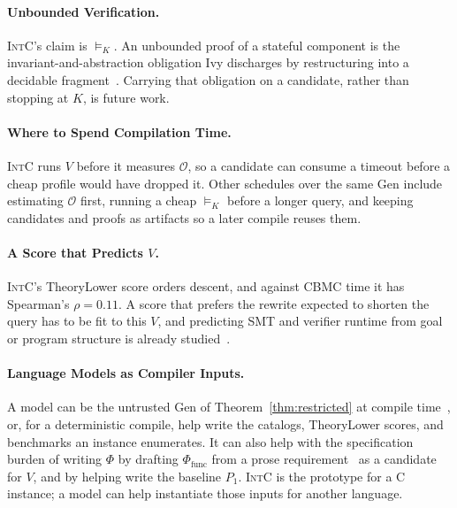 \paragraph{Unbounded Verification.}
\textsc{IntC}'s claim is \(\models_K\). An unbounded proof of a stateful
component is the invariant-and-abstraction obligation Ivy discharges by
restructuring into a decidable
fragment~\cite{padon2016ivy,padon2017paxosepr}. Carrying that obligation
on a candidate, rather than stopping at \(K\), is future work.

\paragraph{Where to Spend Compilation Time.}
\textsc{IntC} runs \(V\) before it measures \(\mathcal{O}\), so a
candidate can consume a timeout before a cheap profile would have
dropped it. Other schedules over the same \(\mathrm{Gen}\) include
estimating \(\mathcal{O}\) first, running a cheap \(\models_K\) before a
longer query, and keeping candidates and proofs as artifacts so a later
compile reuses them.

\paragraph{A Score that Predicts \(V\).}
\textsc{IntC}'s TheoryLower score orders descent, and against CBMC time it
has Spearman's \(\rho = 0.11\). A score that prefers the rewrite expected
to shorten the query has to be fit to this \(V\), and predicting SMT and
verifier runtime from goal or program structure is already
studied~\cite{healy2017where4,leeson2022graves}.

\paragraph{Language Models as Compiler Inputs.}
\label{sec:discussion_lm}
A model can be the untrusted \(\mathrm{Gen}\) of
Theorem~\ref{thm:restricted} at compile
time~\cite{taneja2025llmvectorizer,fang2026llmveriopt,jiang2026segabench},
or, for a deterministic compile, help write the catalogs, TheoryLower
scores, and benchmarks an instance enumerates. It can also help with the
specification burden of writing \(\Phi\) by drafting
\(\Phi_{\text{func}}\) from a prose
requirement~\cite{ma2025specgen,ugare2026fun2spec} as a candidate for
\(V\), and by helping write the baseline \(P_1\). \textsc{IntC} is the prototype
for a C instance; a model can help instantiate those inputs for another
language.

